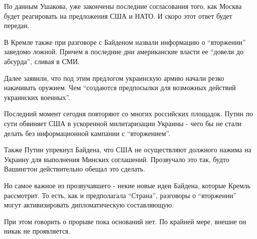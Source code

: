 По данным Ушакова, уже закончены последние согласования того, как Москва будет
реагировать на предложения США и НАТО. И скоро этот ответ будет передан. 

В Кремле также при разговоре с Байденом назвали информацию о \enquote{вторжении}
заведомо ложной. Причем в последние дни американские власти ее \enquote{довели до
абсурда}, сливая в СМИ.

Далее заявили, что под этим предлогом украинскую армию начали резко накачивать
оружием. Чем \enquote{создаются предпосылки для возможных действий украинских военных}.

Последний момент сегодня повторяют со многих российских площадок. Путин по сути
обвиняет США в ускоренной милитаризации Украины - чего бы не стали делать без
информационной кампании с \enquote{вторжением}.

Также Путин упрекнул Байдена, что США не осуществляют должного нажима на
Украину для выполнения Минских соглашений. Прозвучало это так, будто Вашингтон
действительно обещал это сделать. 

Но самое важное из прозвучавшего - некие новые идеи Байдена, которые Кремль
рассмотрит. То есть, как и предполагала \enquote{Страна}, разговоры о \enquote{вторжении} могут
активизировать дипломатическую составляющую.

При этом говорить о прорыве пока оснований нет. По крайней мере, внешне он
никак не проявляется. 

